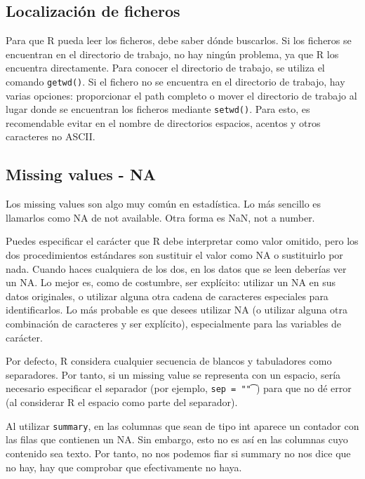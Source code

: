 \documentclass{config/apuntes}\usepackage[]{graphicx}\usepackage[]{xcolor}
\newcommand{\code}[1]{\texttt{#1}}
\begin{document}
\subsection{Localización de ficheros}
Para que R pueda leer los ficheros, debe saber dónde buscarlos. Si los ficheros se encuentran en el directorio de trabajo, no hay ningún problema, ya que R los encuentra directamente. Para conocer el directorio de trabajo, se utiliza el comando \code{getwd()}. Si el fichero no se encuentra en el directorio de trabajo, hay varias opciones: proporcionar el path completo o mover el directorio de trabajo al lugar donde se encuentran los ficheros mediante \code{setwd()}. Para esto, es recomendable evitar en el nombre de directorios espacios, acentos y otros caracteres no ASCII.

\subsection{Missing values - NA}
Los missing values son algo muy común en estadística. Lo más sencillo es llamarlos como NA de not available. Otra forma es NaN, not a number. 

Puedes especificar el carácter que R debe interpretar como valor omitido, pero los dos procedimientos estándares son sustituir el valor como NA o sustituirlo por nada. Cuando haces cualquiera de los dos, en los datos que se leen deberías ver un NA. Lo mejor es, como de costumbre, ser explícito: utilizar un NA en sus datos originales, o utilizar alguna otra cadena de caracteres especiales para identificarlos. Lo más probable es que desees utilizar NA (o utilizar alguna otra combinación de caracteres y ser explícito), especialmente para las variables de carácter.

Por defecto, R considera cualquier secuencia de blancos y tabuladores como separadores. Por tanto, si un missing value se representa con un espacio, sería necesario especificar el separador (por ejemplo, \code{sep = "\t"}) para que no dé error (al considerar R el espacio como parte del separador).

Al utilizar \code{summary}, en las columnas que sean de tipo int aparece un contador con las filas que contienen un NA. Sin embargo, esto no es así en las columnas cuyo contenido sea texto. Por tanto, no nos podemos fiar si summary no nos dice que no hay, hay que comprobar que efectivamente no haya. 
\end{document}
